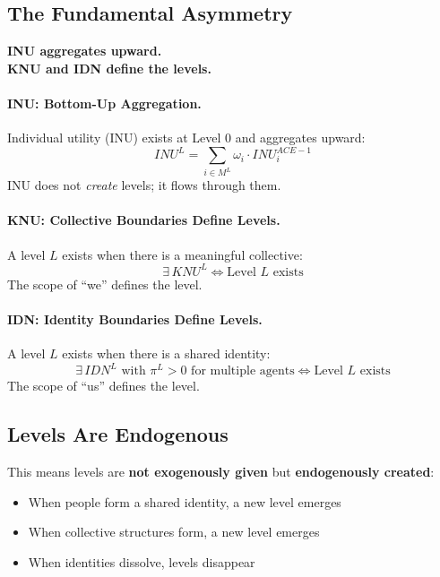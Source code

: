 \subsection{The Fundamental Asymmetry}

\begin{tcolorbox}[colback=blue!5!white, colframe=blue!50!black]
\textbf{INU aggregates upward.} \\
\textbf{KNU and IDN define the levels.}
\end{tcolorbox}

\paragraph{INU: Bottom-Up Aggregation.}
Individual utility (INU) exists at Level 0 and aggregates upward:
\begin{equation}
INU^L = \sum_{i \in M^L} \omega_i \cdot INU^{ACE-1}_i
\end{equation}
INU does not \emph{create} levels; it flows through them.

\paragraph{KNU: Collective Boundaries Define Levels.}
A level $L$ exists when there is a meaningful collective:
\begin{equation}
\exists \, KNU^L \iff \text{Level } L \text{ exists}
\end{equation}
The scope of ``we'' defines the level.

\paragraph{IDN: Identity Boundaries Define Levels.}
A level $L$ exists when there is a shared identity:
\begin{equation}
\exists \, IDN^L \text{ with } \pi^L > 0 \text{ for multiple agents} \iff \text{Level } L \text{ exists}
\end{equation}
The scope of ``us'' defines the level.

\subsection{Levels Are Endogenous}

This means levels are \textbf{not exogenously given} but \textbf{endogenously created}:
\begin{itemize}
\item When people form a shared identity, a new level emerges
\item When collective structures form, a new level emerges
\item When identities dissolve, levels disappear
\end{itemize}

